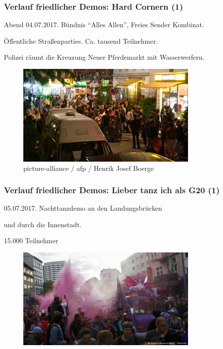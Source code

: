 \documentclass[]{beamer}
\begin{document}
	\begin{frame}
	\frametitle{Verlauf friedlicher Demos: Hard Cornern (1)}
		Abend 04.07.2017. Bündnis \enquote{Alles Allen}, Freies Sender Kombinat.\par
		Öffentliche Straßenparties. Ca. tausend Teilnehmer.\par
		Polizei räumt die Kreuzung Neuer Pferdemarkt mit Wasserwerfern.
	\begin{figure}		
		\renewcommand{\figurename}{Foto} 
		\includegraphics[width=0.8\textwidth]{images/hard-cornern1}
		\caption{picture-alliance / afp / Henrik Josef Boerge}
	\end{figure}
\end{frame}

	\begin{frame}
	\frametitle{Verlauf friedlicher Demos: Lieber tanz ich als G20 (1)}
		05.07.2017. Nachttanzdemo an den Landungsbrücken\par
		und durch die Innenstadt.\par
		15.000 Teilnehmer
	\begin{figure}
		\renewcommand{\figurename}{Foto} 
		\includegraphics[width=0.8\textwidth]{images/lieber-tanz-ich-als-g20-1}
		\caption{}
	\end{figure}
\end{frame}
\end{document}
